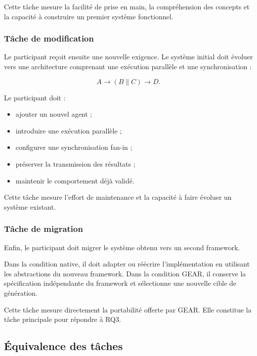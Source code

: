 Cette tâche mesure la facilité de prise en main, la compréhension des
concepts et la capacité à construire un premier système fonctionnel.


\subsubsection{Tâche de modification}

Le participant reçoit ensuite une nouvelle exigence. Le système initial
doit évoluer vers une architecture comprenant une exécution parallèle
et une synchronisation :

\begin{equation}
A \rightarrow (B \parallel C) \rightarrow D.
\end{equation}

Le participant doit :

\begin{itemize}
    \item ajouter un nouvel agent ;
    \item introduire une exécution parallèle ;
    \item configurer une synchronisation fan-in ;
    \item préserver la transmission des résultats ;
    \item maintenir le comportement déjà validé.
\end{itemize}

Cette tâche mesure l'effort de maintenance et la capacité à faire
évoluer un système existant.


\subsubsection{Tâche de migration}

Enfin, le participant doit migrer le système obtenu vers un second
framework.

Dans la condition native, il doit adapter ou réécrire l'implémentation
en utilisant les abstractions du nouveau framework. Dans la condition
GEAR, il conserve la spécification indépendante du framework et
sélectionne une nouvelle cible de génération.

Cette tâche mesure directement la portabilité offerte par GEAR. Elle
constitue la tâche principale pour répondre à RQ3.


\subsection{Équivalence des tâches}
\label{subsec:equivalence-taches}

